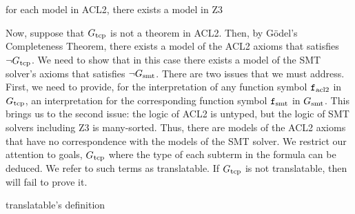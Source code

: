 \begin{theorem}
  for each model in ACL2, there exists a model in Z3
\end{theorem}
Now, suppose that $G_{\mathrm{tcp}}$ is not a theorem in ACL2.  Then, by G\"{o}del's
Completeness Theorem, there exists a model of the ACL2 axioms that satisfies
$\neg G_{\mathrm{tcp}}$. We need to show that in this case there exists a model of the SMT
solver's axioms that satisfies $\neg G_{\mathrm{smt}}$.  There are two issues that we must
address. First, we need to provide, for the interpretation of any function
symbol $\mathtt{f}_{\mathrm{acl2}}$ in $G_{\mathrm{tcp}}$, an interpretation for the corresponding function
symbol $\mathtt{f}_{\mathrm{smt}}$ in $G_{\mathrm{smt}}$.
This brings us to the second issue: the logic of ACL2 is untyped, but the logic
of SMT solvers including Z3 is many-sorted.
Thus, there are models of the ACL2 axioms that have no correspondence with the
models of the SMT solver.
We restrict our attention to goals, $G_{\mathrm{tcp}}$ where the type of each subterm in the
formula can be deduced.  We refer to such terms as translatable.  If $G_{\mathrm{tcp}}$ is
not translatable, then \smtlink{} will fail to prove it.

\begin{definition}
  translatable's definition
\end{definition}


